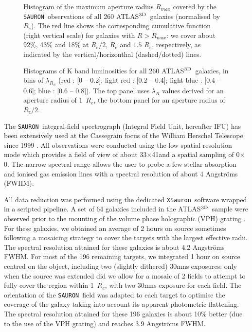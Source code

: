 \documentclass[useAMS,usenatbib,usegraphicx]{mn2e}
\newcommand{\Sauron}{\texttt{SAURON}}
\newcommand{\atlas}{{ATLAS$^{\rm 3D}$}}
\newcommand{\XSauron}{\texttt{XSauron}}
\begin{document}
\begin{figure}
\centering
{}
\caption{Histogram of the maximum aperture radius $R_{max}$ covered by the \Sauron\
observations of all 260 \atlas\ galaxies (normalised by $R_e$). The red line
shows the corresponding cumulative function (right vertical scale) for galaxies with $R > R_{max}$: we
cover about 92\%, 43\% and 18\% at $R_e/2$, $R_e$ and $1.5\,\,R_e$,
respectively, as indicated by the vertical/horizonthal (dashed/dotted) lines.}
\label{fig:Rmax}
\end{figure}
\begin{figure}
\centering
{}
\caption{Histograms of K band luminosities for all 260 \atlas\ galaxies, in bins
of ${\lambda_R}_e$ (red : [0 -- 0.2]; light red : [0.2 -- 0.4]; light blue : [0.4 -- 0.6]; blue
: [0.6 -- 0.8]). The top panel uses $\lambda_R$ values derived for an aperture
radius of 1~$R_e$, the bottom panel for an aperture radius of $R_e/2$.}
\label{fig:histLum}
\end{figure}
The \Sauron\ integral-field spectrograph (Integral Field Unit, hereafter IFU) 
has been extensively used at the Cassegrain focus of the William Herschel Telescope since 1999 \citep{Bacon+01}. 
All observations were conducted 
using the low spatial resolution mode which provides
a field of view of about 33\arcsec$\times$41\arcsec and a 
spatial sampling of 0$\times$0\farcs94. The narrow spectral range allows the user to probe a few stellar absorption and ionised gas emission lines with a spectral resolution of about 4 Angstr\"oms (FWHM). 

All data reduction was performed using the dedicated \XSauron\ software wrapped
in a scripted pipeline. A set of 64 galaxies included in the \atlas\ sample were observed
prior to the mounting of the volume phase holographic (VPH) grating
\citep[mostly from the original \Sauron\ survey, see][for details]{deZeeuw+02}.
For these galaxies, we obtained an average of 2 hours on source sometimes
following a mosaicing strategy to cover the targets with the largest effective
radii. The spectral resolution attained for these galaxies is about 4.2
Angstr\"oms FWHM. For most of the 196 remaining targets, we
integrated 1 hour on source centred on the object, including two (slightly
dithered) 30mns exposures: only when the source was extended did we allow
for a mosaic of 2 fields to attempt to fully cover the region within 1~$R_e$, 
with two 30mns exposure for each field. 
The orientation of the \Sauron\ field was adapted to
each target to optimise the coverage of the galaxy taking into account its
apparent photometric flattening. The spectral resolution attained for these 196
galaxies is about 10\% better (due to the use of the VPH grating) and reaches
3.9 Angstr\"oms FWHM.
\end{document}
